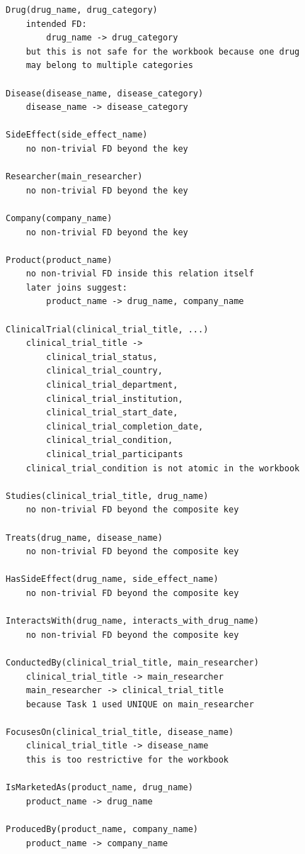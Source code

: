 \documentclass[12pt,a4paper]{article}
\begin{document}
\begin{lstlisting}
Drug(drug_name, drug_category)
    intended FD:
        drug_name -> drug_category
    but this is not safe for the workbook because one drug
    may belong to multiple categories

Disease(disease_name, disease_category)
    disease_name -> disease_category

SideEffect(side_effect_name)
    no non-trivial FD beyond the key

Researcher(main_researcher)
    no non-trivial FD beyond the key

Company(company_name)
    no non-trivial FD beyond the key

Product(product_name)
    no non-trivial FD inside this relation itself
    later joins suggest:
        product_name -> drug_name, company_name

ClinicalTrial(clinical_trial_title, ...)
    clinical_trial_title ->
        clinical_trial_status,
        clinical_trial_country,
        clinical_trial_department,
        clinical_trial_institution,
        clinical_trial_start_date,
        clinical_trial_completion_date,
        clinical_trial_condition,
        clinical_trial_participants
    clinical_trial_condition is not atomic in the workbook

Studies(clinical_trial_title, drug_name)
    no non-trivial FD beyond the composite key

Treats(drug_name, disease_name)
    no non-trivial FD beyond the composite key

HasSideEffect(drug_name, side_effect_name)
    no non-trivial FD beyond the composite key

InteractsWith(drug_name, interacts_with_drug_name)
    no non-trivial FD beyond the composite key

ConductedBy(clinical_trial_title, main_researcher)
    clinical_trial_title -> main_researcher
    main_researcher -> clinical_trial_title
    because Task 1 used UNIQUE on main_researcher

FocusesOn(clinical_trial_title, disease_name)
    clinical_trial_title -> disease_name
    this is too restrictive for the workbook

IsMarketedAs(product_name, drug_name)
    product_name -> drug_name

ProducedBy(product_name, company_name)
    product_name -> company_name
\end{lstlisting}
\end{document}
